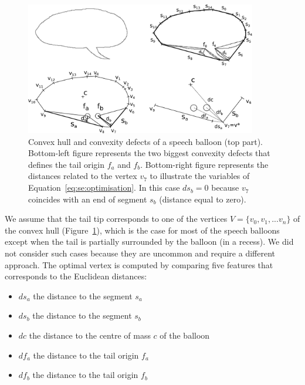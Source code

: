     \begin{figure}[ht]%
      \centering
      \includegraphics[width=0.9\textwidth]{tail_description.pdf}
    \caption[Convex hull and convexity defects of a speech balloon]{Convex hull and convexity defects of a speech balloon (top part). Bottom-left figure represents the two biggest convexity defects that defines the tail origin $f_a$ and $f_b$. Bottom-right figure represents the distances related to the vertex $v_7$ to illustrate the variables of Equation~\ref{eq:se:optimisation}. In this case $ds_b=0$ because $v_7$ coincides with an end of segment $s_b$ (distance equal to zero).}
    \label{fig:se:convexity_defects}
    \end{figure}

We assume that the tail tip corresponds to one of the vertices $V=\{v_0,v_1,...v_n\}$ of the convex hull (Figure~\ref{fig:se:convexity_defects}), which is the case for most of the speech balloons except when the tail is partially surrounded by the balloon (in a recess).
We did not consider such cases because they are uncommon and require a different approach.
The optimal vertex is computed by comparing five features that corresponds to the Euclidean distances:

\begin{itemize}
   \item $ds_a$ the distance to the segment $s_a$
   \item $ds_b$ the distance to the segment $s_b$
   \item $dc$ the distance to the centre of mass $c$ of the balloon
   \item $df_a$ the distance to the tail origin $f_a$
   \item $df_b$ the distance to the tail origin $f_b$
 \end{itemize}

